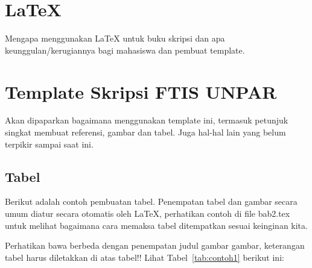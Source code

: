 
\section{\LaTeX}
\label{sec:latex}

Mengapa menggunakan \LaTeX{} untuk buku skripsi dan apa keunggulan/kerugiannya bagi mahasiswa dan pembuat template. 



\section{Template Skripsi FTIS UNPAR}
\label{sec:template}
 
Akan dipaparkan bagaimana menggunakan template ini, termasuk petunjuk singkat membuat referensi, gambar dan tabel.
Juga hal-hal lain yang belum terpikir sampai saat ini. 
 

\subsection{Tabel}  
Berikut adalah contoh pembuatan tabel. 
Penempatan tabel dan gambar secara umum diatur secara otomatis oleh \LaTeX{}, perhatikan contoh di file bab2.tex untuk melihat bagaimana cara memaksa tabel ditempatkan sesuai keinginan kita.

Perhatikan bawa berbeda dengan penempatan judul gambar gambar, keterangan tabel harus diletakkan di atas tabel!!
Lihat Tabel~\ref{tab:contoh1} berikut ini:

